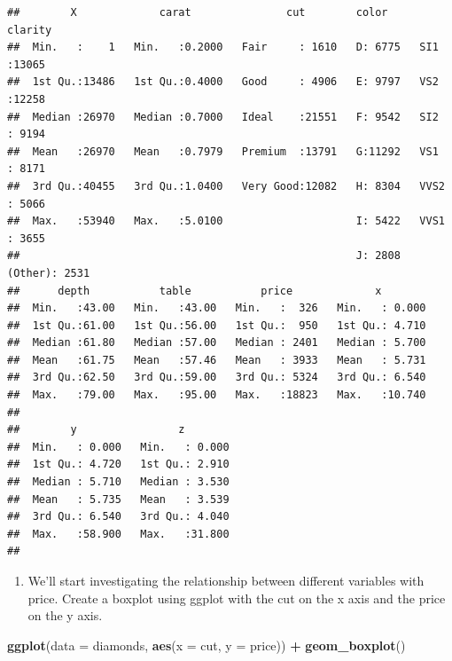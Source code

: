 \documentclass[
]{book}
\newenvironment{Shaded}{\begin{snugshade}}{\end{snugshade}}
\newcommand{\AttributeTok}[1]{\textcolor[rgb]{0.13,0.29,0.53}{#1}}
\newcommand{\FunctionTok}[1]{\textcolor[rgb]{0.13,0.29,0.53}{\textbf{#1}}}
\newcommand{\NormalTok}[1]{#1}
\newcommand{\SpecialCharTok}[1]{\textcolor[rgb]{0.81,0.36,0.00}{\textbf{#1}}}
\providecommand{\tightlist}{%
  \setlength{\itemsep}{0pt}\setlength{\parskip}{0pt}}
\begin{document}
\begin{verbatim}
##        X             carat               cut        color        clarity     
##  Min.   :    1   Min.   :0.2000   Fair     : 1610   D: 6775   SI1    :13065  
##  1st Qu.:13486   1st Qu.:0.4000   Good     : 4906   E: 9797   VS2    :12258  
##  Median :26970   Median :0.7000   Ideal    :21551   F: 9542   SI2    : 9194  
##  Mean   :26970   Mean   :0.7979   Premium  :13791   G:11292   VS1    : 8171  
##  3rd Qu.:40455   3rd Qu.:1.0400   Very Good:12082   H: 8304   VVS2   : 5066  
##  Max.   :53940   Max.   :5.0100                     I: 5422   VVS1   : 3655  
##                                                     J: 2808   (Other): 2531  
##      depth           table           price             x         
##  Min.   :43.00   Min.   :43.00   Min.   :  326   Min.   : 0.000  
##  1st Qu.:61.00   1st Qu.:56.00   1st Qu.:  950   1st Qu.: 4.710  
##  Median :61.80   Median :57.00   Median : 2401   Median : 5.700  
##  Mean   :61.75   Mean   :57.46   Mean   : 3933   Mean   : 5.731  
##  3rd Qu.:62.50   3rd Qu.:59.00   3rd Qu.: 5324   3rd Qu.: 6.540  
##  Max.   :79.00   Max.   :95.00   Max.   :18823   Max.   :10.740  
##                                                                  
##        y                z         
##  Min.   : 0.000   Min.   : 0.000  
##  1st Qu.: 4.720   1st Qu.: 2.910  
##  Median : 5.710   Median : 3.530  
##  Mean   : 5.735   Mean   : 3.539  
##  3rd Qu.: 6.540   3rd Qu.: 4.040  
##  Max.   :58.900   Max.   :31.800  
## 
\end{verbatim}

\begin{enumerate}
\def\labelenumi{\arabic{enumi}.}
\setcounter{enumi}{1}
\tightlist
\item
  We'll start investigating the relationship between different variables with price. Create a boxplot using ggplot with the cut on the x axis and the price on the y axis.
\end{enumerate}

\begin{Shaded}
\begin{Highlighting}[]
\FunctionTok{ggplot}\NormalTok{(}\AttributeTok{data =}\NormalTok{ diamonds, }\FunctionTok{aes}\NormalTok{(}\AttributeTok{x =}\NormalTok{ cut, }\AttributeTok{y =}\NormalTok{ price)) }\SpecialCharTok{+} 
  \FunctionTok{geom\_boxplot}\NormalTok{()}
\end{Highlighting}
\end{Shaded}
\end{document}
